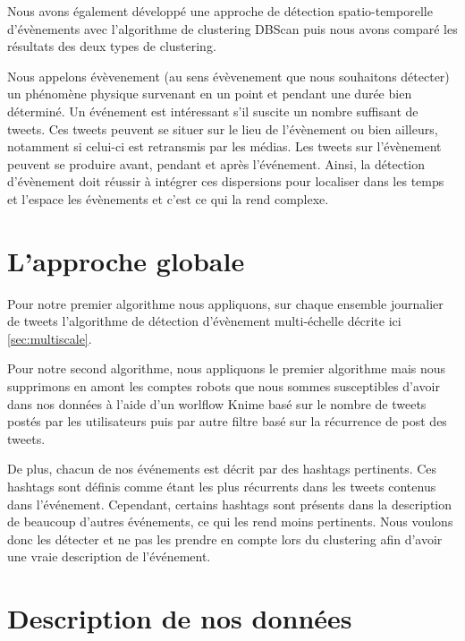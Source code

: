 \documentclass[12pt]{article}
\begin{document}
Nous avons \'egalement d\'evelopp\'e une approche de d\'etection spatio-temporelle d'\'ev\`enements avec l'algorithme de clustering DBScan puis nous avons compar\'e les r\'esultats des deux types de clustering.

Nous appelons \'ev\`evenement (au sens \'ev\`evenement que nous souhaitons d\'etecter) un ph\'enom\`ene physique survenant en un point et pendant une dur\'ee bien d\'etermin\'e. Un \'ev\'enement est int\'eressant s'il suscite un nombre suffisant de tweets. Ces tweets peuvent se situer sur le lieu de l'\'ev\`enement ou bien ailleurs, notamment si celui-ci est retransmis par les m\'edias. Les tweets sur l'\'ev\`enement peuvent se produire avant, pendant et apr\`es l'\'ev\'enement. Ainsi, la d\'etection d'\'ev\`enement doit r\'eussir \`a int\'egrer ces dispersions pour localiser dans les temps et l'espace les \'ev\`enements et c'est ce qui la rend complexe.

\section{L'approche globale}

Pour notre premier algorithme nous appliquons, sur chaque ensemble journalier de tweets l'algorithme de d\'etection d'\'ev\`enement multi-\'echelle décrite ici \autoref{sec:multiscale}.

Pour notre second algorithme, nous appliquons le premier algorithme mais nous supprimons en amont les comptes robots
que nous sommes susceptibles d'avoir dans nos donn\'ees \`a l'aide d'un worlflow Knime bas\'e sur le nombre de tweets post\'es par les utilisateurs puis par autre filtre bas\'e sur la r\'ecurrence de post des tweets. 

De plus, chacun de nos \'ev\'enements est d\'ecrit par des hashtags pertinents. Ces hashtags sont d\'efinis comme \'etant les plus r\'ecurrents dans les tweets contenus dans l'\'ev\'enement. Cependant, certains hashtags sont pr\'esents dans la description de
beaucoup d'autres \'ev\'enements, ce qui les rend moins pertinents. Nous voulons donc les d\'etecter et ne pas les prendre en compte lors du clustering afin d'avoir une vraie description de l'\'ev\'enement.

\newpage

\section{Description de nos donn\'ees}
\label{sec:desc_donnees}
\end{document}
